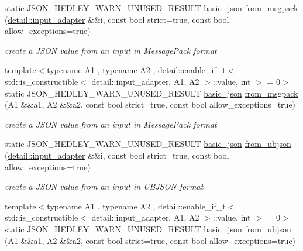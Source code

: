 \begin{DoxyCompactItemize}
static J\+S\+O\+N\+\_\+\+H\+E\+D\+L\+E\+Y\+\_\+\+W\+A\+R\+N\+\_\+\+U\+N\+U\+S\+E\+D\+\_\+\+R\+E\+S\+U\+LT \mbox{\hyperlink{classnlohmann_1_1basic__json}{basic\+\_\+json}} \mbox{\hyperlink{classnlohmann_1_1basic__json_a11458b7982adba51bc634f2f8c961e9b}{from\+\_\+msgpack}} (\mbox{\hyperlink{classnlohmann_1_1detail_1_1input__adapter}{detail\+::input\+\_\+adapter}} \&\&i, const bool strict=true, const bool allow\+\_\+exceptions=true)
\begin{DoxyCompactList}\small\item\em create a J\+S\+ON value from an input in Message\+Pack format \end{DoxyCompactList}\item 
{\footnotesize template$<$typename A1 , typename A2 , detail\+::enable\+\_\+if\+\_\+t$<$ std\+::is\+\_\+constructible$<$ detail\+::input\+\_\+adapter, A1, A2 $>$\+::value, int $>$  = 0$>$ }\\static J\+S\+O\+N\+\_\+\+H\+E\+D\+L\+E\+Y\+\_\+\+W\+A\+R\+N\+\_\+\+U\+N\+U\+S\+E\+D\+\_\+\+R\+E\+S\+U\+LT \mbox{\hyperlink{classnlohmann_1_1basic__json}{basic\+\_\+json}} \mbox{\hyperlink{classnlohmann_1_1basic__json_a022b65246f82c87526940248dc9df6f5}{from\+\_\+msgpack}} (A1 \&\&a1, A2 \&\&a2, const bool strict=true, const bool allow\+\_\+exceptions=true)
\begin{DoxyCompactList}\small\item\em create a J\+S\+ON value from an input in Message\+Pack format \end{DoxyCompactList}\item 
static J\+S\+O\+N\+\_\+\+H\+E\+D\+L\+E\+Y\+\_\+\+W\+A\+R\+N\+\_\+\+U\+N\+U\+S\+E\+D\+\_\+\+R\+E\+S\+U\+LT \mbox{\hyperlink{classnlohmann_1_1basic__json}{basic\+\_\+json}} \mbox{\hyperlink{classnlohmann_1_1basic__json_a1ed52b463d2ef14c85ed076467168c72}{from\+\_\+ubjson}} (\mbox{\hyperlink{classnlohmann_1_1detail_1_1input__adapter}{detail\+::input\+\_\+adapter}} \&\&i, const bool strict=true, const bool allow\+\_\+exceptions=true)
\begin{DoxyCompactList}\small\item\em create a J\+S\+ON value from an input in U\+B\+J\+S\+ON format \end{DoxyCompactList}\item 
{\footnotesize template$<$typename A1 , typename A2 , detail\+::enable\+\_\+if\+\_\+t$<$ std\+::is\+\_\+constructible$<$ detail\+::input\+\_\+adapter, A1, A2 $>$\+::value, int $>$  = 0$>$ }\\static J\+S\+O\+N\+\_\+\+H\+E\+D\+L\+E\+Y\+\_\+\+W\+A\+R\+N\+\_\+\+U\+N\+U\+S\+E\+D\+\_\+\+R\+E\+S\+U\+LT \mbox{\hyperlink{classnlohmann_1_1basic__json}{basic\+\_\+json}} \mbox{\hyperlink{classnlohmann_1_1basic__json_a46afafed69ed4c8ae797afb8445fd42f}{from\+\_\+ubjson}} (A1 \&\&a1, A2 \&\&a2, const bool strict=true, const bool allow\+\_\+exceptions=true)

\end{DoxyCompactItemize}
